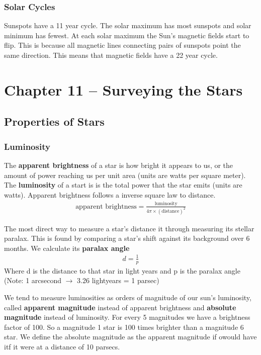 \documentclass[12pt]{article}
\begin{document}
\subsubsection{Solar Cycles}
Sunspots have a 11 year cycle. The solar maximum has most sunspots and solar minimum has fewest. At each solar maximum the Sun's magnetic fields start to flip. This is because all magnetic lines connecting pairs of sunspots point the same direction. This means that magnetic fields have a 22 year cycle.

\section{Chapter 11 -- Surveying the Stars}
\subsection{Properties of Stars}
\subsubsection{Luminosity}
The \textbf{apparent brightness} of a star is how bright it appears to us, or the amount of power reaching us per unit area (units are watts per square meter). The \textbf{luminosity} of a start is is the total power that the star emits (units are watts). Apparent brightness follows a inverse square law to distance.
\begin{align*}
    \text{apparent brightness} = \frac{\text{luminosity}}{4\pi \times (\text{distance})^2}
\end{align*}

The most direct way to measure a star's distance it through measuring its stellar paralax. This is found by comparing a star's shift against its background over 6 months. We calculate its \textbf{paralax angle}
\begin{align*}
    d = \frac{1}{p}
\end{align*}
Where d is the distance to that star in light years and p is the paralax angle (Note: 1 arcsecond $\rightarrow$ 3.26 lightyears = 1 parsec)

We tend to measure luminosities as orders of magnitude of our sun's luminosity, called \textbf{apparent magnitude} instead of apparent brightness and \textbf{absolute magnitude} instead of luminosity. For every 5 magnitudes we have a brightness factor of 100. So a magnitude 1 star is 100 times brighter than a magnitude 6 star. We define the absolute magnitude as the apparent magnitude if owould have itf it were at a distance of 10 parsecs.
\end{document}

